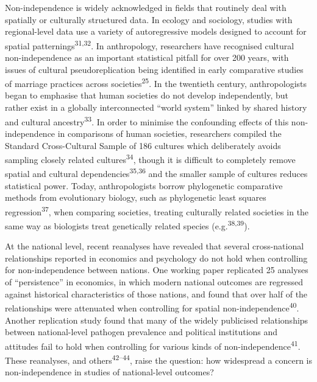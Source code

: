 \documentclass[
  man,floatsintext]{apa6}
\begin{document}
Non-independence is widely acknowledged in fields that routinely deal with spatially or culturally structured data. In ecology and sociology, studies with regional-level data use a variety of autoregressive models designed to account for spatial patternings\textsuperscript{31,32}. In anthropology, researchers have recognised cultural non-independence as an important statistical pitfall for over 200 years, with issues of cultural pseudoreplication being identified in early comparative studies of marriage practices across societies\textsuperscript{25}. In the twentieth century, anthropologists began to emphasise that human societies do not develop independently, but rather exist in a globally interconnected ``world system'' linked by shared history and cultural ancestry\textsuperscript{33}. In order to minimise the confounding effects of this non-independence in comparisons of human societies, researchers compiled the Standard Cross-Cultural Sample of 186 cultures which deliberately avoids sampling closely related cultures\textsuperscript{34}, though it is difficult to completely remove spatial and cultural dependencies\textsuperscript{35,36} and the smaller sample of cultures reduces statistical power. Today, anthropologists borrow phylogenetic comparative methods from evolutionary biology, such as phylogenetic least squares regression\textsuperscript{37}, when comparing societies, treating culturally related societies in the same way as biologists treat genetically related species (e.g.\textsuperscript{38,39}).

At the national level, recent reanalyses have revealed that several cross-national relationships reported in economics and psychology do not hold when controlling for non-independence between nations. One working paper replicated 25 analyses of ``persistence'' in economics, in which modern national outcomes are regressed against historical characteristics of those nations, and found that over half of the relationships were attenuated when controlling for spatial non-independence\textsuperscript{40}. Another replication study found that many of the widely publicised relationships between national-level pathogen prevalence and political institutions and attitudes fail to hold when controlling for various kinds of non-independence\textsuperscript{41}. These reanalyses, and others\textsuperscript{42--44}, raise the question: how widespread a concern is non-independence in studies of national-level outcomes?
\end{document}
